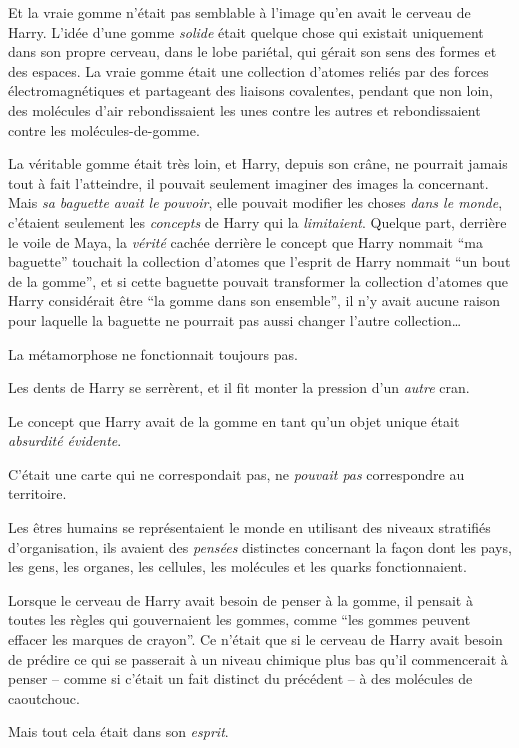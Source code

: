 Et la vraie gomme n'était pas semblable à l'image qu'en avait le cerveau de Harry. L'idée d'une gomme \emph{solide} était quelque chose qui existait uniquement dans son propre cerveau, dans le lobe pariétal, qui gérait son sens des formes et des espaces. La vraie gomme était une collection d'atomes reliés par des forces électromagnétiques et partageant des liaisons covalentes, pendant que non loin, des molécules d'air rebondissaient les unes contre les autres et rebondissaient contre les molécules-de-gomme.

La véritable gomme était très loin, et Harry, depuis son crâne, ne pourrait jamais tout à fait l'atteindre, il pouvait seulement imaginer des images la concernant. Mais \emph{sa baguette avait le pouvoir}, elle pouvait modifier les choses \emph{dans le monde}, c'étaient seulement les \emph{concepts} de Harry qui la \emph{limitaient}. Quelque part, derrière le voile de Maya, la \emph{vérité} cachée derrière le concept que Harry nommait “ma baguette” touchait la collection d'atomes que l'esprit de Harry nommait “un bout de la gomme”, et si cette baguette pouvait transformer la collection d'atomes que Harry considérait être “la gomme dans son ensemble”, il n'y avait aucune raison pour laquelle la baguette ne pourrait pas aussi changer l'autre collection…

La métamorphose ne fonctionnait toujours pas.

Les dents de Harry se serrèrent, et il fit monter la pression d'un \emph{autre} cran.

Le concept que Harry avait de la gomme en tant qu'un objet unique était \emph{absurdité évidente}.

C'était une carte qui ne correspondait pas, ne \emph{pouvait pas} correspondre au territoire.

Les êtres humains se représentaient le monde en utilisant des niveaux stratifiés d'organisation, ils avaient des \emph{pensées} distinctes concernant la façon dont les pays, les gens, les organes, les cellules, les molécules et les quarks fonctionnaient.

Lorsque le cerveau de Harry avait besoin de penser à la gomme, il pensait à toutes les règles qui gouvernaient les gommes, comme “les gommes peuvent effacer les marques de crayon”. Ce n'était que si le cerveau de Harry avait besoin de prédire ce qui se passerait à un niveau chimique plus bas qu'il commencerait à penser -- comme si c'était un fait distinct du précédent -- à des molécules de caoutchouc.

Mais tout cela était dans son \emph{esprit}.

